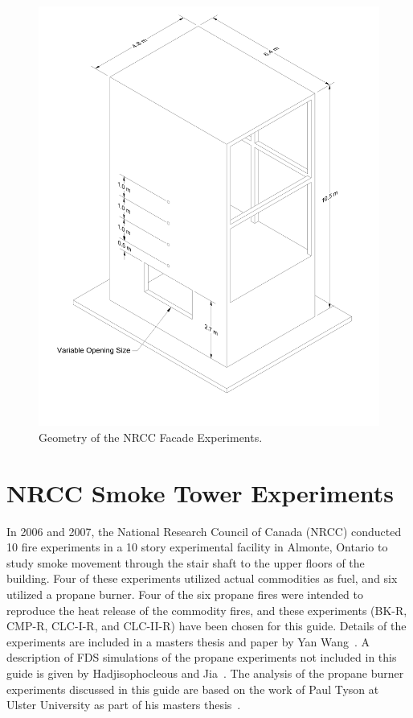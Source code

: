\begin{figure}[p]
\includegraphics[width=\textwidth]{FIGURES/NRCC_Facade/NRCC_Facade}
\caption[Geometry of the NRCC Facade Experiments]{Geometry of the NRCC Facade Experiments.}
\label{NRCC_Facade_Drawing}
\end{figure}


\section{NRCC Smoke Tower Experiments}

In 2006 and 2007, the National Research Council of Canada (NRCC) conducted 10 fire experiments in a 10 story experimental facility in Almonte, Ontario to study smoke movement through the stair shaft to the upper floors of the building. Four of these experiments utilized actual commodities as fuel, and six utilized a propane burner. Four of the six propane fires were intended to reproduce the heat release of the commodity fires, and these experiments (BK-R, CMP-R, CLC-I-R, and CLC-II-R) have been chosen for this guide. Details of the experiments are included in a masters thesis and paper by Yan Wang~\cite{Wang:Thesis,Wang:FT2011}. A description of FDS simulations of the propane experiments not included in this guide is given by Hadjisophocleous and Jia~\cite{Hadjisophocleous:FT2009}. The analysis of the propane burner experiments discussed in this guide are based on the work of Paul Tyson at Ulster University as part of his masters thesis~\cite{Tyson:Thesis}.

